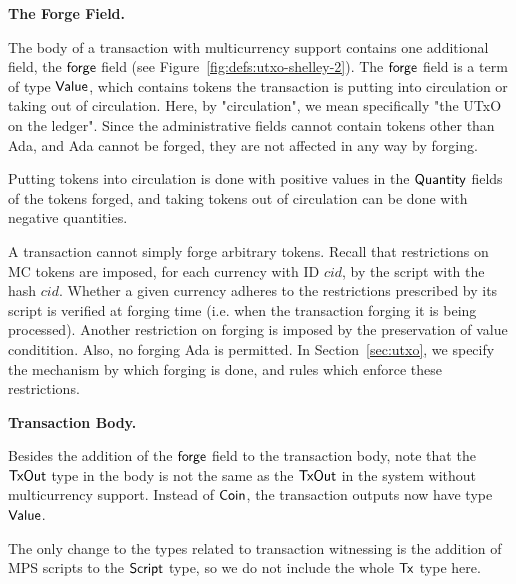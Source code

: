 \textbf{The Forge Field.}

The body of a transaction with multicurrency support contains one additional
field, the $\mathsf{forge}$ field (see Figure~\ref{fig:defs:utxo-shelley-2}).
The $\mathsf{forge}$ field is a term of type $\mathsf{Value}$, which contains
tokens the transaction is putting into circulation or taking out of
circulation. Here, by "circulation", we mean specifically "the UTxO on the
ledger". Since the administrative fields cannot contain tokens other than Ada,
and Ada cannot be forged, they are not affected in any way by forging.

Putting tokens into circulation is done with positive values in the $\mathsf{Quantity}$
fields of the tokens forged, and taking tokens out of circulation can be done
with negative quantities.

A transaction cannot simply forge arbitrary tokens. Recall that restrictions on
MC tokens are imposed, for each currency with ID $cid$, by the script
with the hash $cid$. Whether a given currency adheres to the restrictions
prescribed by its script is verified at forging time (i.e. when the transaction
forging it is being processed). Another restriction on forging is imposed by
the preservation of value conditition. Also, no forging Ada
is permitted. In Section~\ref{sec:utxo}, we specify the mechanism by which
forging is done, and rules which enforce these restrictions.

\textbf{Transaction Body.}

Besides the addition of the $\mathsf{forge}$ field to the transaction body,
note that the $\mathsf{TxOut}$ type in the body is not the same as
the $\mathsf{TxOut}$ in the system without multicurrency support. Instead of
$\mathsf{Coin}$, the transaction outputs now have type $\mathsf{Value}$.

The only change to the types related to transaction witnessing is the addition
of MPS scripts to the $\mathsf{Script}$ type, so we do not include the whole $\mathsf{Tx}$ type here.

